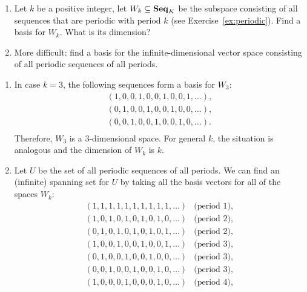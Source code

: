 \begin{ex}
  \begin{enumerate}
  \item Let $k$ be a positive integer, let $W_k\subseteq\mathbf{Seq}_K$ be the
    subspace consisting of all sequences that are periodic%
     with period $k$ (see
    Exercise~\ref{ex:periodic}). Find a basis for $W_k$. What is its
    dimension?
  \item More difficult: find a basis for the infinite-dimensional
    vector space consisting of all periodic sequences of all periods.
  \end{enumerate}
  \begin{sol}
    \begin{enumerate}
    \item In case $k=3$, the following sequences form a basis for
      $W_3$:
      \begin{equation*}
        \begin{array}{l}
          (1,0,0,1,0,0,1,0,0,1,\ldots),\\
          (0,1,0,0,1,0,0,1,0,0,\ldots),\\
          (0,0,1,0,0,1,0,0,1,0,\ldots).\\
        \end{array}
      \end{equation*}
      Therefore, $W_3$ is a 3-dimensional space. For general $k$,
      the situation is analogous and the dimension of $W_k$ is $k$.
    \item Let $U$ be the set of all periodic sequences of all
      periods. We can find an (infinite) spanning set for $U$ by
      taking all the basis vectors for all of the spaces $W_k$:
      \begin{equation*}
        \begin{array}{ll}
          (1,1,1,1,1,1,1,1,1,1,\ldots) & \mbox{(period $1$)},\\[1ex]
          (1,0,1,0,1,0,1,0,1,0,\ldots) & \mbox{(period $2$)},\\
          (0,1,0,1,0,1,0,1,0,1,\ldots) & \mbox{(period $2$)},\\[1ex]
          (1,0,0,1,0,0,1,0,0,1,\ldots) & \mbox{(period $3$)},\\
          (0,1,0,0,1,0,0,1,0,0,\ldots) & \mbox{(period $3$)},\\
          (0,0,1,0,0,1,0,0,1,0,\ldots) & \mbox{(period $3$)},\\[1ex]
          (1,0,0,0,1,0,0,0,1,0,\ldots) & \mbox{(period $4$)},\\

\end{array}
\end{equation*}
\end{enumerate}
\end{sol}
\end{ex}
